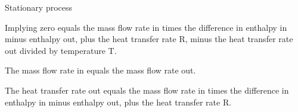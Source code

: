 Stationary process

Implying zero equals the mass flow rate in times the difference in enthalpy in minus enthalpy out, plus the heat transfer rate R, minus the heat transfer rate out divided by temperature T.

The mass flow rate in equals the mass flow rate out.

The heat transfer rate out equals the mass flow rate in times the difference in enthalpy in minus enthalpy out, plus the heat transfer rate R.